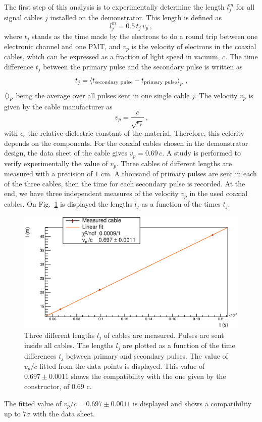The first step of this analysis is to experimentally determine the length $l_{j}^{m}$ for all signal cables $j$ installed on the demonstrator.
This length is defined as
\begin{equation}
  l_{j}^{m}= 0.5\,t_{j}\,v_{p}\, ,
\end{equation}
where $t_{j}$ stands as the time made by the electrons to do a round trip between one electronic channel and one PMT, and $v_{p}$ is the velocity of electrons in the coaxial cables, which can be expressed as a fraction of light speed in vacuum, $c$.
The time difference $t_{j}$ between the primary pulse and the secondary pulse is written as
\begin{equation}
  t_{j} = \braket{t_{\text{secondary pulse}}-t_{\text{primary pulse}}}_{p} \, \text{,}
\end{equation}
$\braket{}_{p}$ being the average over all pulses sent in one single cable $j$.
The velocity $v_{p}$ is given by the cable manufacturer as
\begin{equation*}
  v_{p}=\frac{c}{\sqrt{\epsilon_{r}}}\,\text{,}
\end{equation*}
with $\epsilon_{r}$ the relative dielectric constant of the material.
Therefore, this celerity depends on the components.
For the coaxial cables chosen in the demonstrator design, the data sheet of the cable gives ${v_{p}=0.69\,c}$.
A study is performed to verify experimentally the value of $v_{p}$.
Three cables of different lengths are measured with a precision of $1$ cm.
A thousand of primary pulses are sent in each of the three cables, then the time for each secondary pulse is recorded.
At the end, we have three independent measures of the velocity $v_{p}$ in the used coaxial cables.
On Fig.~\ref{fig:celerity} is displayed the lengths $l_{j}$ as a function of the times $t_{j}$.
\begin{figure}
  \centering
  \includegraphics[width=15cm]{commissioning/fig_commissioning/celerity.eps}
  \caption{Three different lengths $l_{j}$ of cables are measured.
    Pulses are sent inside all cables.
    The lengths $l_{j}$ are plotted as a function of the time differences $t_{j}$ between primary and secondary pulses.
    The value of $v_{p}/c$ fitted from the data points is displayed.
    This value of $0.697\pm 0.0011$ shows the compatibility with the one given by the constructor, of $0.69$ c.
    \label{fig:celerity}}
\end{figure}
The fitted value of $v_{p}/c = 0.697\pm 0.0011$ is displayed and shows a compatibility up to $7\sigma$ with the data sheet.

